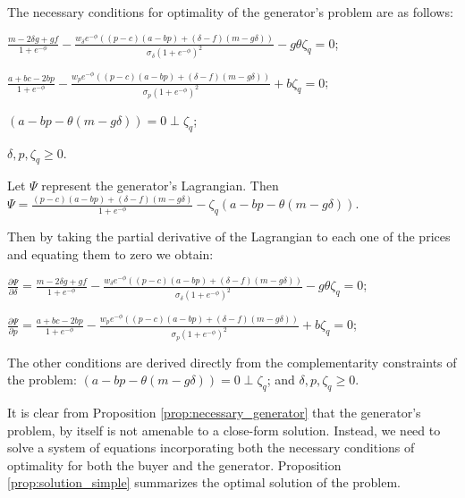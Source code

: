 \documentclass[informs]{informs3}
\begin{document}
\begin{proposition}\label{prop:necessary_generator}
	The necessary conditions for optimality of the generator's problem are as follows:
	
$\frac{m-2\delta g + g f}{1+e^{-\phi}}-\frac{w_{\delta} e^{-\phi} \left(\left(p-c\right)(a - bp )  +\left(\delta-f\right)(m -g\delta)\right)}{\sigma_{\delta}(1+e^{-\phi})^{2}}-g \theta \zeta_q =0$;


$\frac{a+bc-2bp}{1+e^{-\phi}}-\frac{w_p e^{-\phi} \left(\left(p-c\right)(a - bp )  +\left(\delta-f\right)(m -g\delta)\right)}{\sigma_{p}(1+e^{-\phi})^{2}}+b \zeta_q =0$;

$(a - bp -\theta (m -g\delta)) = 0 \perp \zeta_q$; 

$\delta, p, \zeta_q \geq 0$.
\end{proposition}
%
Let $\Psi$ represent the generator's Lagrangian. Then 
$\Psi =\frac{\left(p-c\right)(a - bp )+\left(\delta-f\right)(m -g\delta)}{1+e^{-\phi}} - \zeta_q(a - bp -\theta (m -g\delta))$. 



Then by taking the partial derivative of the Lagrangian to each one of the prices and equating them to zero we obtain:

$\frac{\partial \Psi}{\partial \delta} = \frac{m-2\delta g + g f}{1+e^{-\phi}}-\frac{w_{\delta} e^{-\phi} \left(\left(p-c\right)(a - bp )  +\left(\delta-f\right)(m -g\delta)\right)}{\sigma_{\delta}(1+e^{-\phi})^{2}}-g \theta \zeta_q =0$;



$\frac{\partial \Psi}{\partial p} = \frac{a+bc-2bp}{1+e^{-\phi}}-\frac{w_p e^{-\phi} \left(\left(p-c\right)(a - bp )  +\left(\delta-f\right)(m -g\delta)\right)}{\sigma_{p}(1+e^{-\phi})^{2}}+b \zeta_q =0$;

The other conditions are derived directly from the complementarity constraints of the problem: 
$(a - bp -\theta (m -g\delta)) = 0 \perp \zeta_q$; and $\delta, p, \zeta_q \geq 0$.
\Halmos
\endproof 


It is clear from Proposition \ref{prop:necessary_generator} that the generator's problem, by itself is not amenable to a close-form solution. Instead, we need to solve a system of equations incorporating both the necessary conditions of optimality for both the buyer and the generator. Proposition \ref{prop:solution_simple} summarizes the optimal solution of the problem. 
\end{document}
